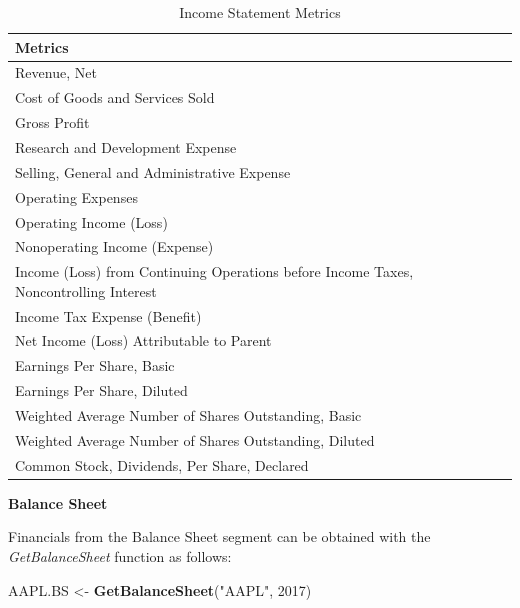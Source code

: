 \documentclass[]{book}
\newenvironment{Shaded}{\begin{snugshade}}{\end{snugshade}}
\newcommand{\KeywordTok}[1]{\textcolor[rgb]{0.13,0.29,0.53}{\textbf{#1}}}
\newcommand{\DecValTok}[1]{\textcolor[rgb]{0.00,0.00,0.81}{#1}}
\newcommand{\StringTok}[1]{\textcolor[rgb]{0.31,0.60,0.02}{#1}}
\newcommand{\NormalTok}[1]{#1}
\theoremstyle{definition}
\theoremstyle{definition}
\theoremstyle{definition}
\theoremstyle{remark}
\begin{document}
\begin{table}[t]

\caption{\label{tab:unnamed-chunk-26}Income Statement Metrics}
\centering
\begin{tabular}{l}
\toprule
Metrics\\
\midrule
Revenue, Net\\
Cost of Goods and Services Sold\\
Gross Profit\\
Research and Development Expense\\
Selling, General and Administrative Expense\\
\addlinespace
Operating Expenses\\
Operating Income (Loss)\\
Nonoperating Income (Expense)\\
Income (Loss) from Continuing Operations before Income Taxes, Noncontrolling Interest\\
Income Tax Expense (Benefit)\\
\addlinespace
Net Income (Loss) Attributable to Parent\\
Earnings Per Share, Basic\\
Earnings Per Share, Diluted\\
Weighted Average Number of Shares Outstanding, Basic\\
Weighted Average Number of Shares Outstanding, Diluted\\
\addlinespace
Common Stock, Dividends, Per Share, Declared\\
\bottomrule
\end{tabular}
\end{table}

\textbf{Balance Sheet}

Financials from the Balance Sheet segment can be obtained with the
\emph{GetBalanceSheet} function as follows:

\begin{Shaded}
\begin{Highlighting}[]
\NormalTok{AAPL.BS <-}\StringTok{ }\KeywordTok{GetBalanceSheet}\NormalTok{(}\StringTok{"AAPL"}\NormalTok{, }\DecValTok{2017}\NormalTok{)}
\end{Highlighting}
\end{Shaded}
\end{document}
